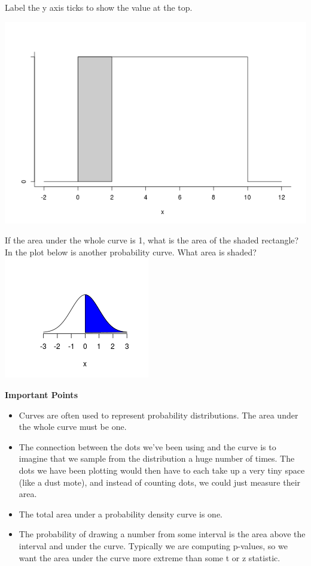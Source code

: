 Label the y axis ticks to show the value at the top. 

\includegraphics[width=.6\linewidth]{plots/uniformDensity0-10.png}


If the area under the whole curve is 1, what is the area of the shaded rectangle?\\

In the plot below is another probability curve. What area is shaded?\\
\includegraphics[width=.4\linewidth]{../plots/halfNormal.png}\vspace{-.5in}


\begin{center}
  {\large\bf Important Points}
\end{center}

\begin{itemize}
\item Curves are often used to represent probability
  distributions. The area under the whole curve must be one.
\item The connection between the dots we've been using and the curve
  is to imagine that we sample from the distribution a huge
  number of times. The dots we have been plotting would then have to
  each take up a very tiny space (like a dust mote), and instead of
  counting dots, we could just measure their area.
\item The total area under a probability density curve is one.
\item The probability of drawing a number from some interval is the
  area above the interval and under the curve.  Typically we are
  computing p-values, so we want the area under the curve more extreme
  than some t or z statistic.
\end{itemize}
